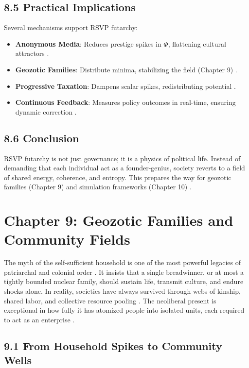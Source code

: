 \documentclass[12pt]{article}
\begin{document}
{{\subsection*{8.5 Practical Implications}

Several mechanisms support RSVP futarchy:
\begin{itemize}
    \item \textbf{Anonymous Media}: Reduces prestige spikes in \(\Phi\), flattening cultural attractors \citep{lanier2018}.
    \item \textbf{Geozotic Families}: Distribute minima, stabilizing the field (Chapter 9) \citep{deleuze1987}.
    \item \textbf{Progressive Taxation}: Dampens scalar spikes, redistributing potential \citep{zuboff2019}.
    \item \textbf{Continuous Feedback}: Measures policy outcomes in real-time, ensuring dynamic correction \citep{hanson2003}.
\end{itemize}

\subsection*{8.6 Conclusion}

RSVP futarchy is not just governance; it is a physics of political life. Instead of demanding that each individual act as a founder-genius, society reverts to a field of shared energy, coherence, and entropy. This prepares the way for geozotic families (Chapter 9) and simulation frameworks (Chapter 10) \citep{whitehead1978}.

\section*{Chapter 9: Geozotic Families and Community Fields}

The myth of the self-sufficient household is one of the most powerful legacies of patriarchal and colonial order \citep{ortega1957}. It insists that a single breadwinner, or at most a tightly bounded nuclear family, should sustain life, transmit culture, and endure shocks alone. In reality, societies have always survived through webs of kinship, shared labor, and collective resource pooling \citep{deleuze1987}. The neoliberal present is exceptional in how fully it has atomized people into isolated units, each required to act as an enterprise \citep{zuboff2019}.

\subsection*{9.1 From Household Spikes to Community Wells}

}}
\end{document}
